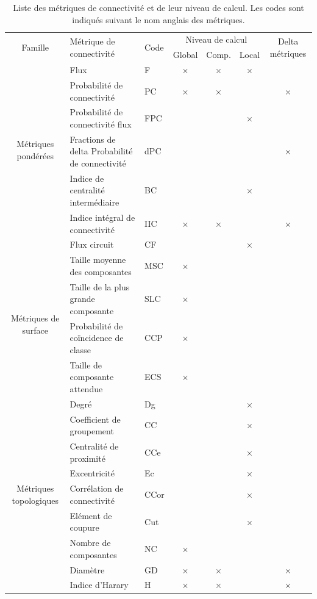 \documentclass{article}
\begin{document}
\begin{table}[H]

\begin{tabular}{|c|p{7cm}|l|c|c|c|c|}
\hline
\multirow{2}{*}{Famille} & \multirow{2}{*}{Métrique de connectivité} & \multirow{2}{*}{Code} & \multicolumn{3}{m{3cm}|}{\centering Niveau de calcul} & \multirow{2}{1.5cm}{Delta métriques}\\
\hhline{~~~---~}
 &  &  & Global & Comp. & Local & \\
\hline
\multirow{6}{2cm}{Métriques pondérées}
 & Flux & F & × & × & × & \\
 & Probabilité de connectivité & PC & × & × &  & ×\\
 & Probabilité de connectivité flux & FPC &  &  & × & \\
 & Fractions de delta Probabilité de connectivité & dPC &  &  &  & ×\\
 & Indice de centralité intermédiaire & BC &  &  & × & \\
 & Indice intégral de connectivité & IIC & × & × &  & ×\\
 & Flux circuit & CF &  &  & × & \\ 
\hline
\multirow{4}{2cm}{Métriques de surface}
 & Taille moyenne des composantes & MSC & × &  &  & \\
 & Taille de la plus grande composante & SLC & × &  &  & \\
 & Probabilité de coïncidence de classe & CCP & × &  &  & \\
 & Taille de composante attendue & ECS & × &  &  & \\
\hline
\multirow{9}{2cm}{Métriques topologiques}
 & Degré & Dg &  &  & × & \\
 & Coefficient de groupement & CC &  &  & × & \\
 & Centralité de proximité & CCe &  &  & × & \\
 & Excentricité & Ec &  &  & × & \\
 & Corrélation de connectivité & CCor &  &  & × & \\
 & Elément de coupure & Cut &  &  & × & \\
 & Nombre de composantes & NC & × &  &  & \\
 & Diamètre & GD & × & × &  & ×\\
 & Indice d’Harary & H & × & × &  & ×\\
\hline
\end{tabular}
\caption{Liste des métriques de connectivité et de leur niveau de calcul. Les codes sont indiqués suivant le nom anglais des métriques.}
\label{metric_level}
\end{table}
\end{document}

